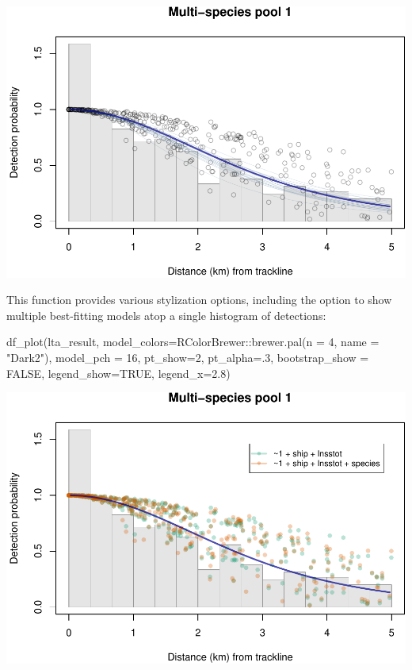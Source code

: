 \documentclass[
]{book}
\newenvironment{Shaded}{\begin{snugshade}}{\end{snugshade}}
\newcommand{\AttributeTok}[1]{\textcolor[rgb]{0.77,0.63,0.00}{#1}}
\newcommand{\ConstantTok}[1]{\textcolor[rgb]{0.00,0.00,0.00}{#1}}
\newcommand{\DecValTok}[1]{\textcolor[rgb]{0.00,0.00,0.81}{#1}}
\newcommand{\FloatTok}[1]{\textcolor[rgb]{0.00,0.00,0.81}{#1}}
\newcommand{\FunctionTok}[1]{\textcolor[rgb]{0.00,0.00,0.00}{#1}}
\newcommand{\NormalTok}[1]{#1}
\newcommand{\SpecialCharTok}[1]{\textcolor[rgb]{0.00,0.00,0.00}{#1}}
\newcommand{\StringTok}[1]{\textcolor[rgb]{0.31,0.60,0.02}{#1}}
\begin{document}
\includegraphics{figures/unnamed-chunk-321-1.pdf}

This function provides various stylization options, including the option to show multiple best-fitting models atop a single histogram of detections:

\begin{Shaded}
\begin{Highlighting}[]
\FunctionTok{df\_plot}\NormalTok{(lta\_result,}
        \AttributeTok{model\_colors=}\NormalTok{RColorBrewer}\SpecialCharTok{::}\FunctionTok{brewer.pal}\NormalTok{(}\AttributeTok{n =} \DecValTok{4}\NormalTok{, }\AttributeTok{name =} \StringTok{"Dark2"}\NormalTok{),}
        \AttributeTok{model\_pch =} \DecValTok{16}\NormalTok{,}
        \AttributeTok{pt\_show=}\DecValTok{2}\NormalTok{,}
        \AttributeTok{pt\_alpha=}\NormalTok{.}\DecValTok{3}\NormalTok{,}
        \AttributeTok{bootstrap\_show =} \ConstantTok{FALSE}\NormalTok{,}
        \AttributeTok{legend\_show=}\ConstantTok{TRUE}\NormalTok{,}
        \AttributeTok{legend\_x=}\FloatTok{2.8}\NormalTok{)}
\end{Highlighting}
\end{Shaded}

\includegraphics{figures/unnamed-chunk-322-1.pdf}
\end{document}
